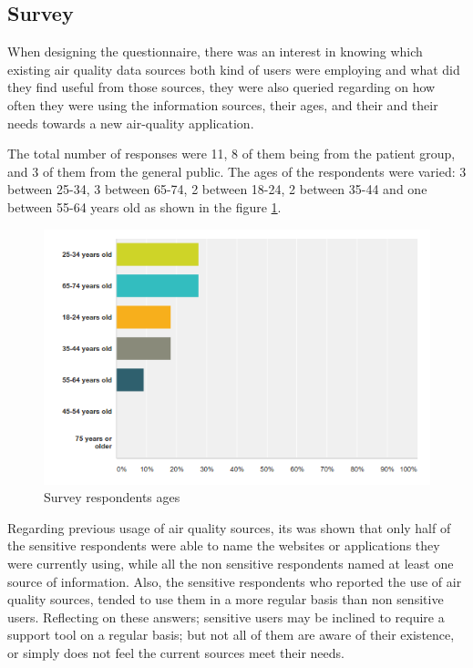 \subsection{Survey}

When designing the questionnaire, there was an interest in knowing which existing air quality data sources both kind of users were employing and what did they find useful from those sources, they were also queried regarding on how often they were using the information sources, their ages, and their and their needs towards a new air-quality application.

The total number of responses were 11, 8 of them being from the patient group, and 3 of them from the general public. The ages of the respondents were varied: 3 between 25-34, 3 between 65-74, 2 between 18-24, 2 between 35-44 and one between 55-64 years old as shown in the figure \ref{fig:survey_ages}. 

\begin{figure}[H]
\begin{adjustbox}{width=1\textwidth,center=\textwidth}
  \centering
  \includegraphics[scale=1]{images/ages_survey.png}
\end{adjustbox}
  \caption[Survey respondents ages ]{Survey respondents ages}
  \label{fig:survey_ages}
\end{figure}

Regarding previous usage of air quality sources, its was shown that only half of the sensitive respondents were able to name the websites or applications they were currently using, while all the non sensitive respondents named at least one source of information. Also, the sensitive respondents who reported the use of air quality sources, tended to use them in a more regular basis than non sensitive users. Reflecting on these answers; sensitive users may be inclined to require a support tool on a regular basis; but not all of them are aware of their existence, or simply does not feel the current sources meet their needs. 

